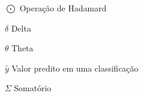 \begin{simbolos}
  \item[$ \bigodot $] Operação de Hadamard
  \item[$ \delta $] Delta
  \item[$ \theta $] Theta
  \item[$ \hat{y} $] Valor predito em uma classificação
  \item[$ \Sigma $] Somatório
\end{simbolos}

\tableofcontents*
\cleardoublepage
